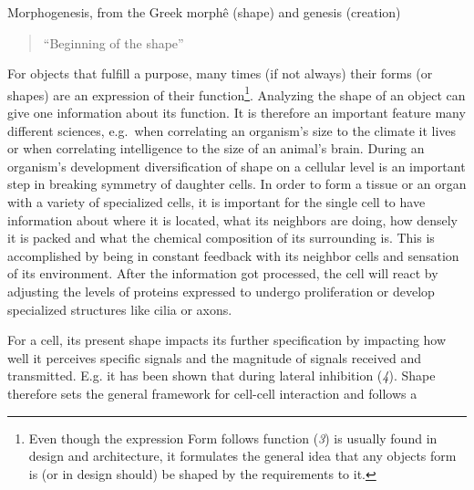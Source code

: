 \documentclass[11pt,singlespacinge,twoside]{reedthesis} %
\begin{document}
Morphogenesis, from the Greek morphê (shape) and genesis (creation)
\begin{quote}
``Beginning of the shape''
\end{quote}
For objects that fulfill a purpose, many times (if not always) their forms (or shapes) are an expression of their function\footnote{Even though the expression Form follows function (\emph{3}) is usually found in design and architecture, it formulates the general idea that any objects form is (or in design should) be shaped by the requirements to it.}. Analyzing the shape of an object can give one information about its function. It is therefore an important feature many different sciences, e.g.~when correlating an organism's size to the climate it lives or when correlating intelligence to the size of an animal's brain. During an organism's development diversification of shape on a cellular level is an important step in breaking symmetry of daughter cells. In order to form a tissue or an organ with a variety of specialized cells, it is important for the single cell to have information about where it is located, what its neighbors are doing, how densely it is packed and what the chemical composition of its surrounding is. This is accomplished by being in constant feedback with its neighbor cells and sensation of its environment. After the information got processed, the cell will react by adjusting the levels of proteins expressed to undergo proliferation or develop specialized structures like cilia or axons.

For a cell, its present shape impacts its further specification by impacting how well it perceives specific signals and the magnitude of signals received and transmitted. E.g. it has been shown that during lateral inhibition (\emph{4}). Shape therefore sets the general framework for cell-cell interaction and follows a\newline

\newline
\end{document}
